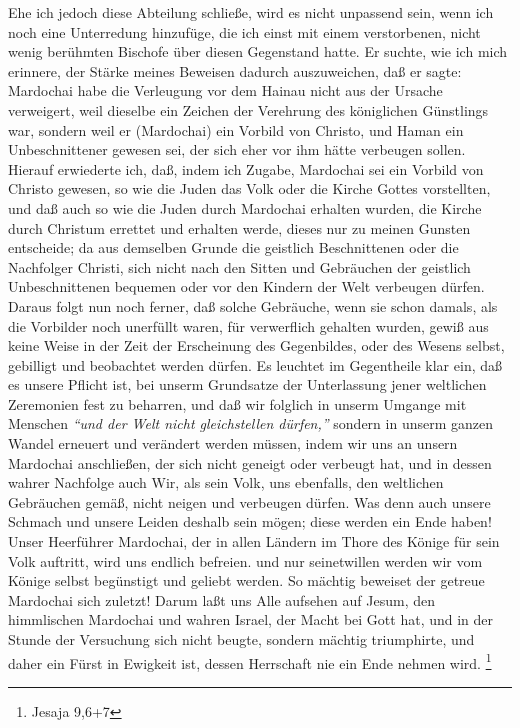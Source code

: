 Ehe ich jedoch diese Abteilung schließe, wird es nicht unpassend sein, wenn ich
noch eine Unterredung hinzufüge, die ich einst mit einem verstorbenen, nicht
wenig berühmten Bischofe über diesen Gegenstand
hatte. Er suchte, wie ich mich
erinnere, der Stärke meines Beweisen dadurch auszuweichen, daß er sagte:
Mardochai habe die Verleugung vor dem Hainau nicht
aus der Ursache verweigert,
weil dieselbe ein Zeichen der Verehrung des königlichen Günstlings war, sondern
weil er (Mardochai) ein Vorbild von Christo, und Haman ein Unbeschnittener
gewesen sei, der sich eher vor ihm hätte verbeugen sollen. Hierauf erwiederte
ich, daß, indem ich Zugabe, Mardochai sei ein Vorbild von Christo gewesen, so
wie die Juden das Volk oder die Kirche Gottes vorstellten, und daß auch so wie
die Juden durch Mardochai erhalten wurden, die
Kirche durch Christum errettet
und erhalten werde, dieses nur zu meinen Gunsten entscheide; da aus demselben
Grunde die geistlich Beschnittenen oder die
Nachfolger Christi, sich nicht nach
den Sitten und Gebräuchen der geistlich Unbeschnittenen bequemen oder vor den
Kindern der Welt verbeugen dürfen. Daraus folgt nun noch ferner, daß solche
Gebräuche, wenn sie schon damals, als die Vorbilder noch unerfüllt waren, für
verwerflich gehalten wurden, gewiß aus keine Weise in der Zeit der Erscheinung
des Gegenbildes, oder des Wesens selbst, gebilligt und beobachtet werden dürfen.
Es leuchtet im Gegentheile klar ein, daß es unsere Pflicht ist, bei unserm
Grundsatze der Unterlassung jener weltlichen Zeremonien fest zu beharren, und
daß wir folglich in unserm Umgange mit Menschen
\textit{"`und der Welt nicht gleichstellen dürfen,"'} 
sondern in unserm ganzen Wandel erneuert und verändert
werden müssen, indem wir uns an unsern Mardochai anschließen, der sich nicht
geneigt oder verbeugt hat, und in dessen wahrer Nachfolge auch Wir, als sein
Volk, uns ebenfalls, den weltlichen Gebräuchen gemäß, nicht neigen und verbeugen
dürfen. Was denn auch unsere Schmach und unsere Leiden deshalb sein mögen; diese
werden ein Ende haben! Unser Heerführer Mardochai, der in allen Ländern im Thore
des Könige für sein Volk auftritt, wird uns endlich befreien. und nur
seinetwillen werden wir vom Könige selbst begünstigt und geliebt werden. So
mächtig beweiset der getreue Mardochai sich zuletzt! Darum laßt uns Alle
aufsehen auf Jesum, den himmlischen Mardochai und wahren
Israel, der Macht bei
Gott hat, und in der Stunde der Versuchung sich nicht beugte,
sondern mächtig
triumphirte, und daher ein Fürst in Ewigkeit ist, dessen Herrschaft nie ein Ende
nehmen wird.
\footnote{Jesaja 9,6+7}


